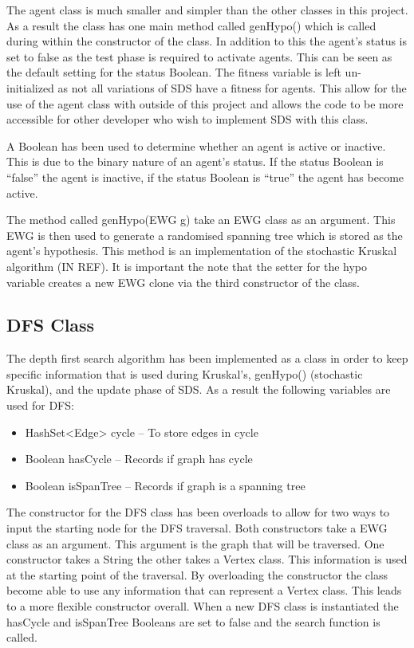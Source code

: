 \documentclass{AISB2008}
\begin{document}
The agent class is much smaller and simpler than the other classes in this project. As a result the class has one main method called genHypo() which is called during within the constructor of the class. In addition to this the agent’s status is set to false as the test phase is required to activate agents. This can be seen as the default setting for the status Boolean. The fitness variable is left un-initialized as not all variations of SDS have a fitness for agents. This allow for the use of the agent class with outside of this project and allows the code to be more accessible for other developer who wish to implement SDS with this class.

A Boolean has been used to determine whether an agent is active or inactive. This is due to the binary nature of an agent’s status. If the status Boolean is “false” the agent is inactive, if the status Boolean is “true” the agent has become active.

The method called genHypo(EWG g) take an EWG class as an argument. This EWG is then used to generate a randomised spanning tree which is stored as the agent’s hypothesis. This method is an implementation of the stochastic Kruskal algorithm (IN REF).
It is important the note that the setter for the hypo variable creates a new EWG clone via the third constructor of the class.


\subsection{DFS Class}

The depth first search algorithm has been implemented as a class in order to keep specific information that is used during Kruskal’s, genHypo() (stochastic Kruskal), and the update phase of SDS. As a result the following variables are used for DFS:

\begin{itemize}
\item HashSet<Edge> cycle – To store edges in cycle
\item Boolean hasCycle – Records if graph has cycle
\item Boolean isSpanTree – Records if graph is a spanning tree 
\end{itemize}

The constructor for the DFS class has been overloads to allow for two ways to input the starting node for the DFS traversal. Both constructors take a EWG class as an argument. This argument is the graph that will be traversed. One constructor takes a String the other takes a Vertex class. This information is used at the starting point of the traversal. By overloading the constructor the class become able to use any information that can represent a Vertex class. This leads to a more flexible constructor overall. When a new DFS class is instantiated the hasCycle and isSpanTree Booleans are set to false and the search function is called.
\end{document}
